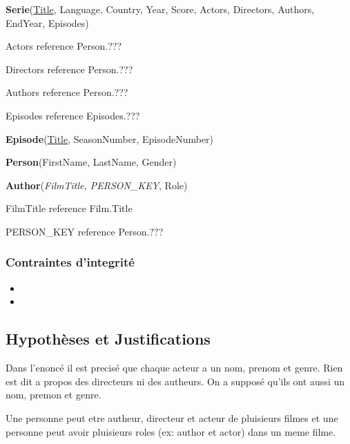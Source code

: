 \documentclass[12pt,a4paper]{article}
\begin{document}
			\textbf{Serie}(\underline{Title}, Language, Country, Year, Score, Actors, Directors, Authors, EndYear, Episodes)\par
				\hspace{4ex} Actors reference Person.???\par
				\hspace{4ex} Directors reference Person.???\par
				\hspace{4ex} Authors reference Person.???\par
				\hspace{4ex} Episodes reference Episodes.???\\\par

			\textbf{Episode}(\underline{Title}, SeasonNumber, EpisodeNumber)\\\par

			\textbf{Person}(FirstName, LastName, Gender)\\\par

			\textbf{Author}(\textit{FilmTitle, PERSON\_KEY}, Role)\par
				\hspace{4ex} FilmTitle reference Film.Title\par
				\hspace{4ex} PERSON\_KEY reference Person.???\\\par


			\subsubsection*{Contraintes d'integrité}
				\begin{itemize}
					\item
					\item
				\end{itemize}



		\subsection*{Hypothèses et Justifications}
			Dans l'enoncé il est precisé que chaque acteur a un nom, prenom et genre. Rien est dit a propos des directeurs ni des autheurs. On a supposé qu'ils ont aussi un nom, premon et genre.\par
			Une personne peut etre autheur, directeur et acteur de pluisieurs filmes et une personne peut avoir pluisieurs roles (ex: author et actor) dans un meme filme.\par
\end{document}
